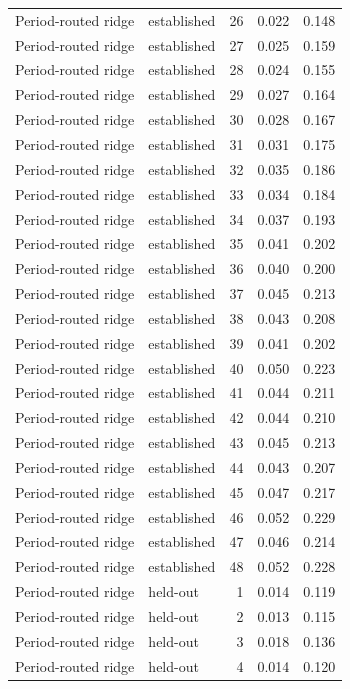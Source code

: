 \begin{tabular}{llrrr}
Period-routed ridge & established & 26 & 0.022 & 0.148 \\
Period-routed ridge & established & 27 & 0.025 & 0.159 \\
Period-routed ridge & established & 28 & 0.024 & 0.155 \\
Period-routed ridge & established & 29 & 0.027 & 0.164 \\
Period-routed ridge & established & 30 & 0.028 & 0.167 \\
Period-routed ridge & established & 31 & 0.031 & 0.175 \\
Period-routed ridge & established & 32 & 0.035 & 0.186 \\
Period-routed ridge & established & 33 & 0.034 & 0.184 \\
Period-routed ridge & established & 34 & 0.037 & 0.193 \\
Period-routed ridge & established & 35 & 0.041 & 0.202 \\
Period-routed ridge & established & 36 & 0.040 & 0.200 \\
Period-routed ridge & established & 37 & 0.045 & 0.213 \\
Period-routed ridge & established & 38 & 0.043 & 0.208 \\
Period-routed ridge & established & 39 & 0.041 & 0.202 \\
Period-routed ridge & established & 40 & 0.050 & 0.223 \\
Period-routed ridge & established & 41 & 0.044 & 0.211 \\
Period-routed ridge & established & 42 & 0.044 & 0.210 \\
Period-routed ridge & established & 43 & 0.045 & 0.213 \\
Period-routed ridge & established & 44 & 0.043 & 0.207 \\
Period-routed ridge & established & 45 & 0.047 & 0.217 \\
Period-routed ridge & established & 46 & 0.052 & 0.229 \\
Period-routed ridge & established & 47 & 0.046 & 0.214 \\
Period-routed ridge & established & 48 & 0.052 & 0.228 \\
Period-routed ridge & held-out & 1 & 0.014 & 0.119 \\
Period-routed ridge & held-out & 2 & 0.013 & 0.115 \\
Period-routed ridge & held-out & 3 & 0.018 & 0.136 \\
Period-routed ridge & held-out & 4 & 0.014 & 0.120 \\

\end{tabular}
